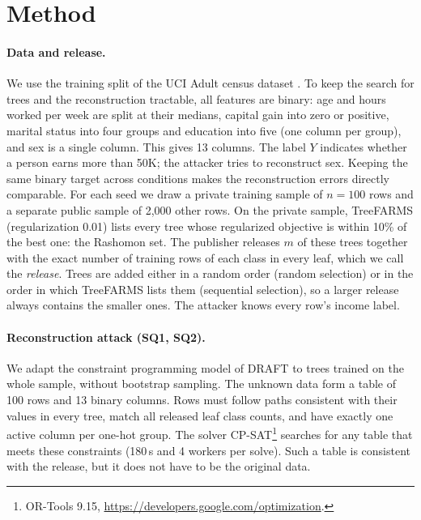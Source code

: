 \section{Method}

\paragraph{Data and release.} We use the training split of the UCI Adult census dataset
  \citep{becker1996adult}. To keep the search for trees and the reconstruction tractable, all
  features are binary: age and hours worked per week are split at their medians, capital
  gain into zero or positive, marital status into four groups and education into five (one
  column per group), and sex is a single column. This gives 13 columns. The label $Y$ indicates
  whether a person earns more than 50K; the attacker tries to reconstruct sex. Keeping the same binary target across conditions
  makes the reconstruction errors directly comparable. For each seed
  we draw a private training sample of $n=100$ rows and a separate public sample of 2,000
  other rows. On the private sample, TreeFARMS \citep{xin2022treefarms} (regularization
  0.01) lists every tree whose regularized objective is within 10\% of the best one: the
  Rashomon set. The publisher releases $m$ of these trees together with the exact number of
  training rows of each class in every leaf, which we call the \emph{release}. Trees are
  added either in a random order (random selection) or in the order in which TreeFARMS lists
  them (sequential selection), so a larger release always contains the smaller ones. The attacker knows every row's income label.

\paragraph{Reconstruction attack (SQ1, SQ2).} We adapt the constraint programming model of
  DRAFT \citep{ferry2024draft} to trees trained on the whole sample, without bootstrap
  sampling. The unknown data form a table of 100 rows and 13 binary columns. Rows must follow paths consistent with their values in every tree, match all released
  leaf class counts, and have exactly one active column per one-hot group. The solver
  CP-SAT\footnote{OR-Tools 9.15, \url{https://developers.google.com/optimization}.} searches
  for any table that meets these constraints (180\,s and 4 workers per solve). Such a table is
  consistent with the release, but it does not have to be the original data.

